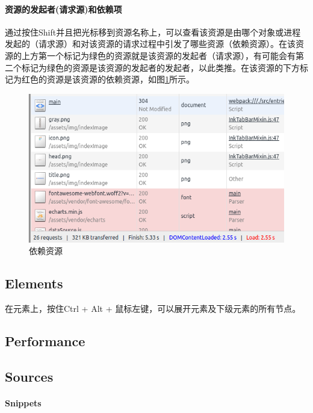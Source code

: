\documentclass[letter]{book}
\begin{document}
\paragraph{资源的发起者(请求源)和依赖项}

通过按住Shift并且把光标移到资源名称上，可以查看该资源是由哪个对象或进程发起的（请求源）和对该资源的请求过程中引发了哪些资源（依赖资源）。在该资源的上方第一个标记为绿色的资源就是该资源的发起者（请求源），有可能会有第二个标记为绿色的资源是该资源的发起者的发起者，以此类推。在该资源的下方标记为红色的资源是该资源的依赖资源，如图\ref{fig:resourcedependency}所示。

\begin{figure}[htbp]
	\centering
	\includegraphics[scale=0.5]{resourcedependency.png}
	\caption{依赖资源}
	\label{fig:resourcedependency}
\end{figure}


\subsection{Elements}

在元素上，按住Ctrl + Alt + 鼠标左键，可以展开元素及下级元素的所有节点。


\subsection{Performance}



\subsection{Sources}

\paragraph{Snippets}
\end{document}
